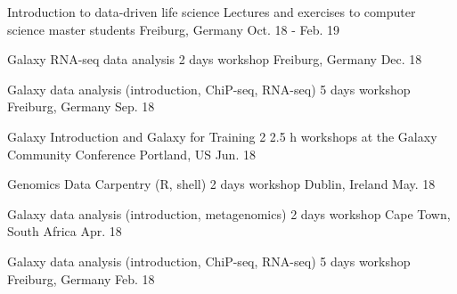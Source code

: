 



\begin{cvhonors}

  \cvhonor
    {Introduction to data-driven life science} %
    {Lectures and exercises to computer science master students} %
    {Freiburg, Germany} %
    {Oct. 18 - Feb. 19} %

  \cvhonor
    {Galaxy RNA-seq data analysis} %
    {2 days workshop} %
    {Freiburg, Germany} %
    {Dec. 18} %

  \cvhonor
    {Galaxy data analysis (introduction, ChiP-seq, RNA-seq)} %
    {5 days workshop} %
    {Freiburg, Germany} %
    {Sep. 18} %

\cvhonor
    {Galaxy Introduction and Galaxy for Training} %
    {2 2.5 h workshops at the Galaxy Community Conference} %
    {Portland, US} %
    {Jun. 18} %

  \cvhonor
    {Genomics Data Carpentry (R, shell)} %
    {2 days workshop} %
    {Dublin, Ireland} %
    {May. 18} %

\cvhonor
    {Galaxy data analysis (introduction, metagenomics)} %
    {2 days workshop} %
    {Cape Town, South Africa} %
    {Apr. 18} %

  \cvhonor
    {Galaxy data analysis (introduction, ChiP-seq, RNA-seq)} %
    {5 days workshop} %
    {Freiburg, Germany} %
    {Feb. 18} %

\end{cvhonors}

